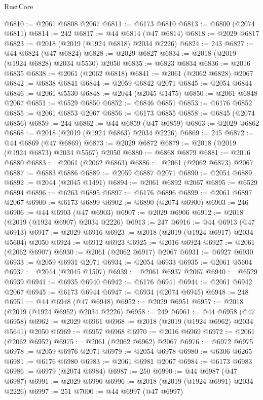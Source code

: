 \begin{lexlean}{RustCore}
\begin{coremodule}
@6810 := @2061 @6808 @2067
@6811 := @6173 @6810
@6813 := @6800 (@2074 @6811)
@6814 := 242
@6817 := @44 @6814 (@47 @6814)
@6818 := @2029 @6817
@6823 := @2018 (@2019 (@1924 @6818) @2034 @2226)
@6824 := 243
@6827 := @44 @6824 (@47 @6824)
@6828 := @2029 @6827
@6834 := @2018 (@2019 (@1924 @6828) @2034 @5530) @2050
@6835 := @6823 @6834
@6836 := @2016 @6835
@6838 := @2061 (@2062 @6818)
@6841 := @2061 (@2062 @6828) @2067
@6842 := @6838 @6841
@6844 := @2059 @6842 @2071
@6845 := @2054 @6844
@6846 := @2061 @5530
@6848 := @2044 (@2045 @1475)
@6850 := @2061 @6848 @2067
@6851 := @6529 @6850
@6852 := @6846 @6851
@6853 := @6176 @6852
@6855 := @2061 @6853 @2067
@6856 := @6173 @6855
@6858 := @6845 (@2074 @6856)
@6859 := 244
@6862 := @44 @6859 (@47 @6859)
@6863 := @2029 @6862
@6868 := @2018 (@2019 (@1924 @6863) @2034 @2226)
@6869 := 245
@6872 := @44 @6869 (@47 @6869)
@6873 := @2029 @6872
@6879 := @2018 (@2019 (@1924 @6873) @2034 @5567) @2050
@6880 := @6868 @6879
@6881 := @2016 @6880
@6883 := @2061 (@2062 @6863)
@6886 := @2061 (@2062 @6873) @2067
@6887 := @6883 @6886
@6889 := @2059 @6887 @2071
@6890 := @2054 @6889
@6892 := @2044 (@2045 @1491)
@6894 := @2061 @6892 @2067
@6895 := @6529 @6894
@6896 := @6263 @6895
@6897 := @6176 @6896
@6899 := @2061 @6897 @2067
@6900 := @6173 @6899
@6902 := @6890 (@2074 @6900)
@6903 := 246
@6906 := @44 @6903 (@47 @6903)
@6907 := @2029 @6906
@6912 := @2018 (@2019 (@1924 @6907) @2034 @2226)
@6913 := 247
@6916 := @44 @6913 (@47 @6913)
@6917 := @2029 @6916
@6923 := @2018 (@2019 (@1924 @6917) @2034 @5604) @2050
@6924 := @6912 @6923
@6925 := @2016 @6924
@6927 := @2061 (@2062 @6907)
@6930 := @2061 (@2062 @6917) @2067
@6931 := @6927 @6930
@6933 := @2059 @6931 @2071
@6934 := @2054 @6933
@6935 := @2061 @5604
@6937 := @2044 (@2045 @1507)
@6939 := @2061 @6937 @2067
@6940 := @6529 @6939
@6941 := @6935 @6940
@6942 := @6176 @6941
@6944 := @2061 @6942 @2067
@6945 := @6173 @6944
@6947 := @6934 (@2074 @6945)
@6948 := 248
@6951 := @44 @6948 (@47 @6948)
@6952 := @2029 @6951
@6957 := @2018 (@2019 (@1924 @6952) @2034 @2226)
@6958 := 249
@6961 := @44 @6958 (@47 @6958)
@6962 := @2029 @6961
@6968 := @2018 (@2019 (@1924 @6962) @2034 @5641) @2050
@6969 := @6957 @6968
@6970 := @2016 @6969
@6972 := @2061 (@2062 @6952)
@6975 := @2061 (@2062 @6962) @2067
@6976 := @6972 @6975
@6978 := @2059 @6976 @2071
@6979 := @2054 @6978
@6980 := @6306 @6265
@6981 := @6176 @6980
@6983 := @2061 @6981 @2067
@6984 := @6173 @6983
@6986 := @6979 (@2074 @6984)
@6987 := 250
@6990 := @44 @6987 (@47 @6987)
@6991 := @2029 @6990
@6996 := @2018 (@2019 (@1924 @6991) @2034 @2226)
@6997 := 251
@7000 := @44 @6997 (@47 @6997)

\end{coremodule}
\end{lexlean}
